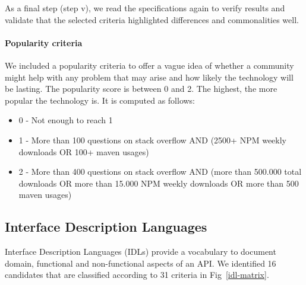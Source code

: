 As a final step (step v), we read the specifications again to verify results and validate  that the selected criteria highlighted differences and commonalities well.

\paragraph{Popularity criteria}


We included a popularity criteria to offer a vague idea of whether a community might help with any problem that may arise and how likely the technology will be lasting. The popularity score is between 0 and 2. The highest, the more popular the technology is. It is computed as follows:

\begin{itemize}
    \item 0 - Not enough to reach 1
    \item 1 - More than 100 questions on stack overflow AND (2500+ NPM weekly downloads OR 100+ maven usages)
    \item 2 - More than 400 questions on stack overflow AND (more than 500.000 total downloads OR more than 15.000 NPM weekly downloads OR more than 500 maven usages)
\end{itemize}

\subsection{Interface Description Languages}

Interface Description Languages (IDLs) provide a vocabulary to document domain, functional and non-functional aspects of an API. We identified 16 candidates that are classified according to 31 criteria in Fig~\ref{idl-matrix}.

